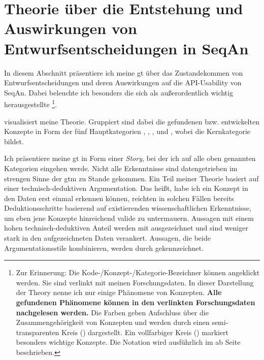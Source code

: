 \section[Theorie: Folgen von SeqAn-Entwurfsentscheidungen]{Theorie über die Entstehung und Auswirkungen von Entwurfsentscheidungen in SeqAn}
\label{sec:gt}

In diesem Abschnitt präsentiere ich meine \gls{gt} über das Zustandekommen von Entwurfsentscheidungen und deren Auswirkungen auf die API-Usability von SeqAn. Dabei beleuchte ich besonders die sich als außerordentlich wichtig herausgestellte \footnote{Zur Erinnerung: Die Kode-/Konzept-/Kategorie-Bezeichner können angeklickt werden. Sie sind verlinkt mit meinen Forschungsdaten. In dieser Darstellung der Theory nenne ich nur einige Phänomene von Konzepten. \textbf{Alle gefundenen Phänomene können in den verlinkten Forschungsdaten nachgelesen werden.} Die Farben geben Aufschluss über die Zusammengehörigkeit von Konzepten und werden durch einen semi-transparenten Kreis () dargestellt. Ein vollfarbiger Kreis () markiert besonders wichtige Konzepte. Die Notation wird ausführlich im  ab Seite \pageref{sec:notationen} beschrieben.}.

 visualisiert meine Theorie. Gruppiert sind dabei die gefundenen bzw. entwickelten Konzepte in Form der fünf Hauptkategorien , , ,  und , wobei  die Kernkategorie bildet.

Ich präsentiere meine \gls{gt} in Form einer \textit{Story}, bei der ich auf alle oben genannten Kategorien eingehen werde. Nicht alle Erkenntnisse sind datengetrieben im strengen Sinne der \gls{gtm} zu Stande gekommen. Ein Teil meiner Theorie basiert auf einer technisch-deduktiven Argumentation. Das heißt, habe ich ein Konzept in den Daten erst einmal erkennen können, reichten in solchen Fällen bereits Deduktionsschritte basierend auf existierenden wissenschaftlichen Erkenntnisse, um eben jene Konzepte hinreichend valide zu untermauern. Aussagen mit einem hohen technisch-deduktiven Anteil werden mit  ausgezeichnet und sind weniger stark in den aufgezeichneten Daten verankert. Aussagen, die beide Argumentationsstile kombinieren, werden durch  gekennzeichnet.

